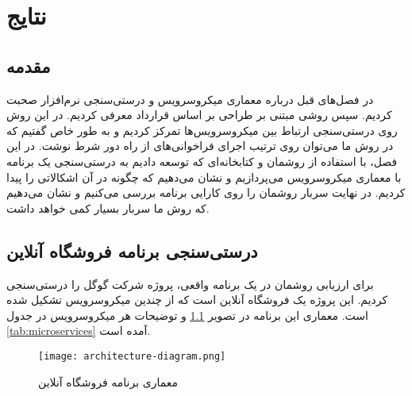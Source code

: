\chapter{نتایج}
\label{chap:results}
\section{مقدمه} 
در فصل‌های قبل درباره معماری میکروسرویس و درستی‌سنجی نرم‌افزار صحبت کردیم. سپس روشی مبتنی بر طراحی بر اساس قرارداد معرفی کردیم. در این روش روی درستی‌سنجی ارتباط بین میکروسرویس‌ها تمرکز کردیم و به طور خاص گفتیم که در روش ما می‌توان روی ترتیب اجرای فراخوانی‌های از راه دور شرط نوشت. در این فصل،‌ با استفاده از روشمان و کتابخانه‌ای که توسعه دادیم به درستی‌سنجی یک برنامه با معماری میکروسرویس می‌پردازیم و نشان می‌دهیم که چگونه در آن اشکالاتی را پیدا کردیم. در نهایت سربار روشمان را روی کارایی برنامه بررسی می‌کنیم و نشان می‌دهیم که روش ما سربار بسیار کمی خواهد داشت.

\section{درستی‌سنجی برنامه فروشگاه آنلاین}
برای ارزیابی روشمان در یک برنامه واقعی، پروژه
 \cite{microservicesDemo}
شرکت گوگل را درستی‌سنجی کردیم. این پروژه یک فروشگاه آنلاین است که از چندین میکروسرویس تشکیل شده است. معماری این برنامه در تصویر
\ref{fig:arch}
و توضیحات هر میکروسرویس در جدول
\ref{tab:microservices}
آمده است.

\begin{figure}[ht]
\centerline{\texttt{[image: architecture-diagram.png]}}
\caption{معماری برنامه فروشگاه آنلاین}
\label{fig:arch}
\end{figure}


